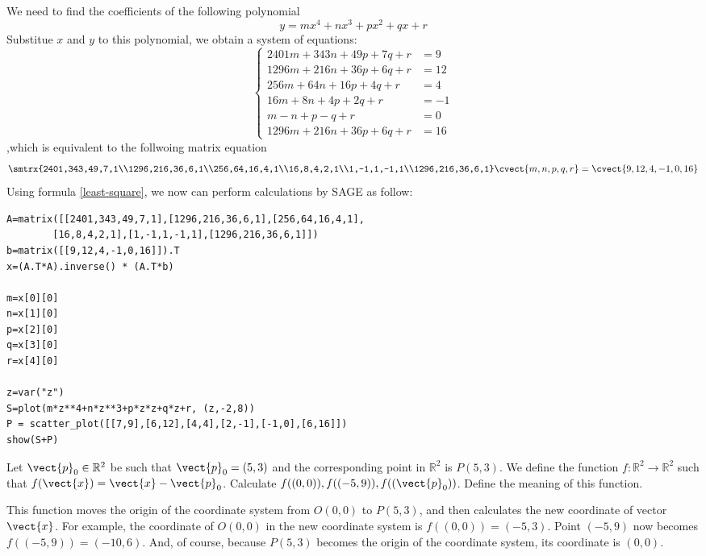 \begin{solution}
We need to find the coefficients of the following polynomial
\[ y=mx^4+nx^3+px^2+qx+r \]
Substitue $x$ and $y$ to this polynomial, we obtain a system of equations:
\begin{equation*}
\begin{cases}
2401m+343n+49p+7q+r &=9\\
1296m+216n+36p+6q+r &=12\\
256m+64n+16p+4q+r &=4\\
16m+8n+4p+2q+r &=-1\\
m-n+p-q+r&=0\\
1296m+216n+36p+6q+r &=16
\end{cases}
\end{equation*}
,which is equivalent to the follwoing matrix equation
\[ \smtrx{2401,343,49,7,1\\1296,216,36,6,1\\256,64,16,4,1\\16,8,4,2,1\\1,-1,1,-1,1\\1296,216,36,6,1} \cvect{m,n,p,q,r} = \cvect{9,12,4,-1,0,16} \]
Using formula \eqref{least-square}, we now can perform calculations by SAGE as follow:
\begin{verbatim}
A=matrix([[2401,343,49,7,1],[1296,216,36,6,1],[256,64,16,4,1],
        [16,8,4,2,1],[1,-1,1,-1,1],[1296,216,36,6,1]])
b=matrix([[9,12,4,-1,0,16]]).T
x=(A.T*A).inverse() * (A.T*b) 

m=x[0][0]
n=x[1][0]
p=x[2][0]
q=x[3][0]
r=x[4][0]

z=var("z")
S=plot(m*z**4+n*z**3+p*z*z+q*z+r, (z,-2,8))
P = scatter_plot([[7,9],[6,12],[4,4],[2,-1],[-1,0],[6,16]])
show(S+P)
\end{verbatim}
\end{solution}

\begin{exercise}\label{change-origin}
Let $\vect{p}_0 \in \mathbb{R}^2$ be such that $\vect{p}_0 =(5,3)$ and the corresponding point in $\mathbb{R}^2$ is $P(5,3)$. We define the function $f:\mathbb{R}^2\rightarrow\mathbb{R}^2$ such that $f(\vect{x})=\vect{x}-\vect{p}_0$. Calculate $f((0,0)),f((-5,9)),f((\vect{p}_0))$. Define the meaning of this function.
\end{exercise}

\begin{solution}
This function moves the origin of the coordinate system from $O(0,0)$ to $P(5,3)$, and then calculates the new coordinate of vector $\vect{x}$. For example, the coordinate of $O(0,0)$ in the new coordinate system is $f((0,0))=(-5,3)$. Point $(-5,9)$ now becomes $f((-5,9))=(-10,6)$. And, of course, because $P(5,3)$ becomes the origin of the coordinate system, its coordinate is $(0,0)$.
\end{solution}

